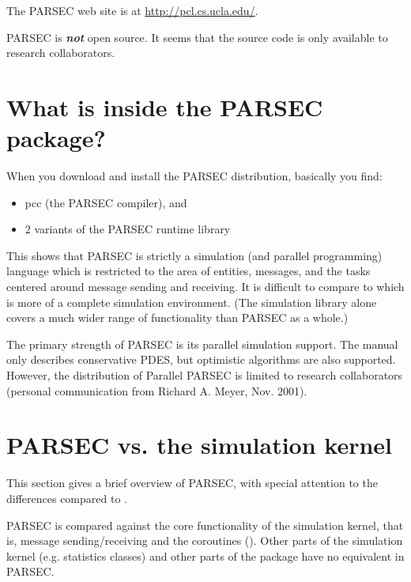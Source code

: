 The PARSEC web site is at \href{http://pcl.cs.ucla.edu/}{http://pcl.cs.ucla.edu/}.


PARSEC is \textbf{\textit{not}} open source. It seems that the source code
is only available to research collaborators.





\section{What is inside the PARSEC package?}

When you download and install the PARSEC distribution, basically
you find:
\begin{itemize}
\item{pcc (the PARSEC compiler), and}
\item{2 variants of the PARSEC runtime library}
\end{itemize}


This shows that PARSEC is strictly a simulation (and parallel
programming) language which is restricted to the area of entities,
messages, and the tasks centered around message sending and receiving.
It is difficult to compare to {\opp} which is more of a complete
simulation environment. (The {\opp} simulation library alone
covers a much wider range of functionality than PARSEC as a whole.)


The primary strength of PARSEC is its parallel simulation support.
The manual only describes conservative PDES, but optimistic algorithms
are also supported. However, the distribution of Parallel PARSEC
is limited to research collaborators (personal communication
from Richard A. Meyer, Nov. 2001).





\section{PARSEC vs. the {\opp} simulation kernel}

This section gives a brief overview of PARSEC, with special attention
to the differences compared to {\opp}.

PARSEC is compared against the core functionality of the {\opp}
simulation kernel, that is, message sending/receiving and the
coroutines (). Other parts of the {\opp} simulation
kernel (e.g. statistics classes) and other parts of the {\opp}
package have no equivalent in PARSEC.


